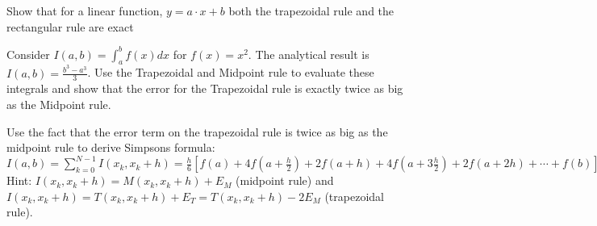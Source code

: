 \documentclass[graybox,sectrefs,envcountresetchap,open=right,final]{svmonodo}
\newenvironment{doconceexercise}{}{}
\newcounter{doconceexercisecounter}
\begin{document}
\begin{doconceexercise}




Show that for a linear function, $y=a\cdot x+b$ both the trapezoidal rule and the rectangular rule are exact

Consider $I(a,b)=\int_a^bf(x)dx$ for $f(x)=x^2$. The analytical result is $I(a,b)=\frac{b^3-a^3}{3}$. Use the Trapezoidal and 
  Midpoint rule to evaluate these integrals and show that the error for the Trapezoidal rule is exactly twice as big as the Midpoint rule.

Use the fact that the error term on the trapezoidal rule is twice as big as the midpoint rule to derive Simpsons formula: $I(a,b)=\sum_{k=0}^{N-1}I(x_k,x_k+h)=\frac{h}{6}\left[f(a)+ 4f(a+\frac{h}{2})+2f(a+h)+4f(a+3\frac{h}{2})+2f(a+2h)+\cdots+f(b)\right]$ Hint: $I(x_k,x_k+h)=M(x_k,x_k+h)+E_M$ (midpoint rule) and $I(x_k,x_k+h)=T(x_k,x_k+h)+E_T=T(x_k,x_k+h)-2E_M$ (trapezoidal rule).



\end{doconceexercise}
\end{document}

